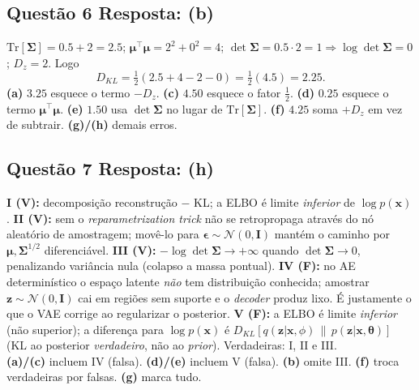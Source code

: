 \documentclass[11pt,a4paper]{article}
\newcommand{\thetav}{\boldsymbol{\theta}}
\begin{document}
\subsection*{Questão 6 \textemdash{} Resposta: (b)}
$\mathrm{Tr}[\boldsymbol{\Sigma}] = 0.5 + 2 = 2.5$; \quad $\boldsymbol{\mu}^{\top}\boldsymbol{\mu} = 2^2 + 0^2 = 4$; \quad $\det\boldsymbol{\Sigma} = 0.5\cdot 2 = 1 \Rightarrow \log\det\boldsymbol{\Sigma} = 0$; \quad $D_z = 2$. Logo
\[
D_{KL} = \tfrac{1}{2}(2.5 + 4 - 2 - 0) = \tfrac{1}{2}(4.5) = 2.25.
\]
\textbf{(a)} $3.25$ esquece o termo $-D_z$.
\textbf{(c)} $4.50$ esquece o fator $\tfrac{1}{2}$.
\textbf{(d)} $0.25$ esquece o termo $\boldsymbol{\mu}^{\top}\boldsymbol{\mu}$.
\textbf{(e)} $1.50$ usa $\det\boldsymbol{\Sigma}$ no lugar de $\mathrm{Tr}[\boldsymbol{\Sigma}]$.
\textbf{(f)} $4.25$ soma $+D_z$ em vez de subtrair.
\textbf{(g)/(h)} demais erros.

\subsection*{Questão 7 \textemdash{} Resposta: (h)}
\textbf{I (V):} decomposição reconstrução $-$ KL; a ELBO é limite \emph{inferior} de $\log p(\mathbf{x})$.
\textbf{II (V):} sem o \textit{reparametrization trick} não se retropropaga através do nó aleatório de amostragem; movê-lo para $\boldsymbol{\epsilon} \sim \mathcal{N}(0,\mathbf{I})$ mantém o caminho por $\boldsymbol{\mu}, \boldsymbol{\Sigma}^{1/2}$ diferenciável.
\textbf{III (V):} $-\log\det\boldsymbol{\Sigma} \to +\infty$ quando $\det\boldsymbol{\Sigma} \to 0$, penalizando variância nula (colapso a massa pontual).
\textbf{IV (F):} no AE determinístico o espaço latente \emph{não} tem distribuição conhecida; amostrar $\mathbf{z}\sim\mathcal{N}(0,\mathbf{I})$ cai em regiões sem suporte e o \textit{decoder} produz lixo. É justamente o que o VAE corrige ao regularizar o posterior.
\textbf{V (F):} a ELBO é limite \emph{inferior} (não superior); a diferença para $\log p(\mathbf{x})$ é $D_{KL}[q(\mathbf{z}|\mathbf{x},\phi)\,\|\,p(\mathbf{z}|\mathbf{x},\thetav)]$ (KL ao posterior \emph{verdadeiro}, não ao \textit{prior}).
Verdadeiras: I, II e III.\\
\textbf{(a)/(c)} incluem IV (falsa).
\textbf{(d)/(e)} incluem V (falsa).
\textbf{(b)} omite III.
\textbf{(f)} troca verdadeiras por falsas.
\textbf{(g)} marca tudo.
\end{document}
